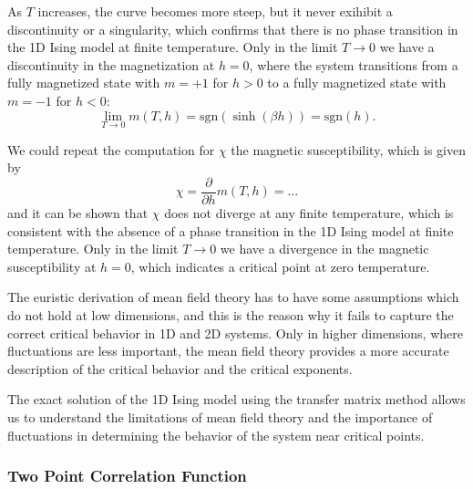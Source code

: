 
As \(T\) increases, the curve becomes more steep, but it never exihibit a discontinuity or a singularity, which confirms that there is no phase transition in the 1D Ising model at finite temperature. Only in the limit \(T \to 0\) we have a discontinuity in the magnetization at \(h = 0\), where the system transitions from a fully magnetized state with \(m = +1\) for \(h > 0\) to a fully magnetized state with \(m = -1\) for \(h < 0\):
\[
    \lim_{T \to 0} m(T,h) = \text{sgn}(\sinh(\beta h)) = \text{sgn}(h).
\]

We could repeat the computation for \(\chi\) the magnetic susceptibility, which is given by
\[
    \chi = \frac{\partial}{\partial h} m(T,h) = \dots
\]
and it can be shown that \(\chi\) does not diverge at any finite temperature, which is consistent with the absence of a phase transition in the 1D Ising model at finite temperature. Only in the limit \(T \to 0\) we have a divergence in the magnetic susceptibility at \(h = 0\), which indicates a critical point at zero temperature.

The euristic derivation of mean field theory has to have some assumptions which do not hold at low dimensions, and this is the reason why it fails to capture the correct critical behavior in 1D and 2D systems. Only in higher dimensions, where fluctuations are less important, the mean field theory provides a more accurate description of the critical behavior and the critical exponents.

The exact solution of the 1D Ising model using the transfer matrix method allows us to understand the limitations of mean field theory and the importance of fluctuations in determining the behavior of the system near critical points.

\subsubsection{Two Point Correlation Function}

